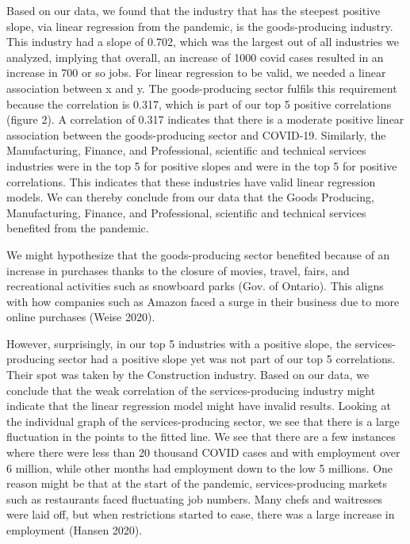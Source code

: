 \documentclass[fontsize=11pt]{article}
\begin{document}
 \bigskip \bigskip \bigskip \bigskip \bigskip \bigskip \bigskip \bigskip \bigskip \bigskip \bigskip \bigskip \bigskip \bigskip \bigskip \bigskip

 \newline


Based on our data, we found that the industry that has the steepest positive slope, via linear regression from the pandemic, is the goods-producing industry. This industry had a slope of 0.702, which was the largest out of all industries we analyzed, implying that overall, an increase of 1000 covid cases resulted in an increase in 700 or so jobs. For linear regression to be valid, we needed a linear association between x and y. The goods-producing sector fulfils this requirement because the correlation is 0.317, which is part of our top 5 positive correlations (figure 2). A correlation of 0.317 indicates that there is a moderate positive linear association between the goods-producing sector and COVID-19. Similarly, the Manufacturing, Finance, and Professional, scientific and technical services industries were in the top 5 for positive slopes and were in the top 5 for positive correlations. This indicates that these industries have valid linear regression models. We can thereby conclude from our data that the Goods Producing, Manufacturing, Finance, and Professional, scientific and technical services benefited from the pandemic. \newline

We might hypothesize that the goods-producing sector benefited because of an increase in purchases thanks to the closure of movies, travel, fairs, and recreational activities such as snowboard parks (Gov. of Ontario). This aligns with how companies such as Amazon faced a surge in their business due to more online purchases (Weise 2020). \newline

However, surprisingly, in our top 5 industries with a positive slope, the services-producing sector had a positive slope yet was not part of our top 5 correlations. Their spot was taken by the Construction industry. Based on our data, we conclude that the weak correlation of the services-producing industry might indicate that the linear regression model might have invalid results. Looking at the individual graph of the services-producing sector, we see that there is a large fluctuation in the points to the fitted line. We see that there are a few instances where there were less than 20 thousand COVID cases and with employment over 6 million, while other months had employment down to the low 5 millions. One reason might be that at the start of the pandemic, services-producing markets such as restaurants faced fluctuating job numbers. Many chefs and waitresses were laid off, but when restrictions started to ease, there was a large increase in employment (Hansen 2020). \newline
\end{document}
